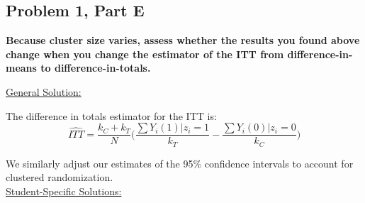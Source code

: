 \documentclass[11pt,notitlepage]{article}
\begin{document}
\clearpage


\subsection{Problem 1, Part E} {\bf Because cluster size varies, assess whether the results you found above change when you change the estimator of the ITT from difference-in-means to difference-in-totals.}

\vspace{1cm}


\underline{{\sc General Solution:}}

The difference in totals estimator for the ITT is:
$$ \widehat{ITT} = \dfrac{k_C + k_T}{N} \Big( \dfrac{\sum Y_i(1)|z_i = 1}{k_T} - \dfrac{\sum Y_i(0)|z_i = 0}{k_C} \Big) $$

We similarly adjust our estimates of the 95\% confidence intervals to account for clustered randomization.\\

\underline{{\sc Student-Specific Solutions:}}
\end{document}
